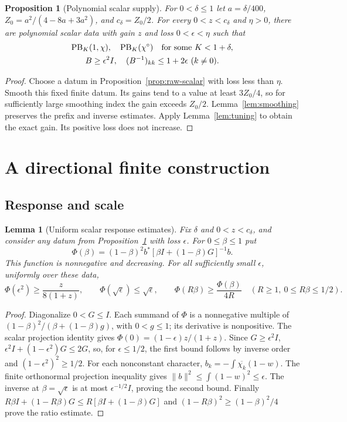 \documentclass[reqno,a4paper,12pt]{amsart}
\newtheorem{proposition}[theorem]{Proposition}
\newtheorem{lemma}[theorem]{Lemma}
\theoremstyle{definition}
\newcommand{\PB}{\operatorname{PB}}
\begin{document}
\begin{proposition}[Polynomial scalar supply]\label{prop:scalar-supply}
For $0<\delta\le1$ let $a=\delta/400$,
$Z_0=a^2/(4-8a+3a^2)$, and $c_\delta=Z_0/2$.
For every $0<z<c_\delta$ and $\eta>0$, there are polynomial scalar data
with gain $z$ and loss $0<\epsilon<\eta$ such that
\[
 \begin{gathered}
 \PB_K(1,\chi),\quad \PB_K(\chi^\circ)
 \quad\hbox{for some }K<1+\delta,\\
 B\ge\epsilon^2I,\quad (B^{-1})_{kk}\le1+2\epsilon\ (k\ne0).
 \end{gathered}
\]
\end{proposition}
\begin{proof}
Choose a datum in Proposition~\ref{prop:raw-scalar} with loss less
than $\eta$. Smooth this fixed finite datum. Its gains tend to a
value at least $3Z_0/4$, so for sufficiently large smoothing index
the gain exceeds $Z_0/2$. Lemma~\ref{lem:smoothing} preserves the
prefix and inverse estimates. Apply Lemma~\ref{lem:tuning} to obtain
the exact gain. Its positive loss does not increase.
\end{proof}

\section{A directional finite construction}
\subsection{Response and scale}
\begin{lemma}[Uniform scalar response estimates]\label{lem:response}
Fix $\delta$ and $0<z<c_\delta$, and consider any datum from
Proposition~\ref{prop:scalar-supply} with loss $\epsilon$.
For $0\le\beta\le1$ put
\[
 \Phi(\beta)=(1-\beta)^2b^*[\beta I+(1-\beta)G]^{-1}b.
\]
This function is nonnegative and decreasing. For all sufficiently small
$\epsilon$, uniformly over these data,
\[
 \Phi(\epsilon^2)\ge\frac{z}{8(1+z)},\qquad
 \Phi(\sqrt\epsilon)\le\sqrt\epsilon,\qquad
 \Phi(R\beta)\ge\frac{\Phi(\beta)}{4R}
 \quad(R\ge1,\ 0\le R\beta\le1/2).
\]
\end{lemma}
\begin{proof}
Diagonalize $0<G\le I$. Each summand of $\Phi$ is a nonnegative
multiple of $(1-\beta)^2/(\beta+(1-\beta)g)$, with $0<g\le1$;
its derivative is nonpositive. The scalar projection identity gives
$\Phi(0)=(1-\epsilon)z/(1+z)$.
Since $G\ge\epsilon^2I$,
$\epsilon^2I+(1-\epsilon^2)G\le2G$, so, for $\epsilon\le1/2$,
the first bound follows by inverse order and
$(1-\epsilon^2)^2\ge1/2$.
For each nonconstant character,
$b_k=-\int\overline{\chi_k}(1-w)$. The finite orthonormal projection
inequality gives $\|b\|^2\le\int(1-w)^2\le\epsilon$.
The inverse at $\beta=\sqrt\epsilon$ is at most
$\epsilon^{-1/2}I$, proving the second bound.
Finally
$R\beta I+(1-R\beta)G\le R[\beta I+(1-\beta)G]$ and
$(1-R\beta)^2\ge(1-\beta)^2/4$ prove the ratio estimate.
\end{proof}
\end{document}
